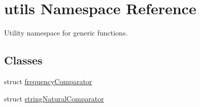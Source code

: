 \hypertarget{namespaceutils}{}\section{utils Namespace Reference}
\label{namespaceutils}


Utility namespace for generic functions.  


\subsection*{Classes}
\begin{DoxyCompactItemize}
\item 
struct \hyperlink{structutils_1_1frequency_comparator}{frequency\+Comparator}
\item 
struct \hyperlink{structutils_1_1string_natural_comparator}{string\+Natural\+Comparator}
\end{DoxyCompactItemize}
